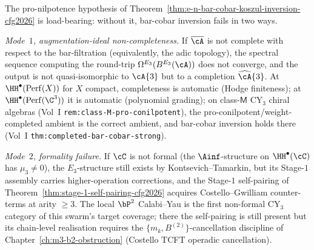 \begin{remark}
\label{rem:failure-modes-e3-bar-cobar-cfg2026}
The pro-nilpotence hypothesis of
Theorem~\textup{\ref{thm:e-n-bar-cobar-koszul-inversion-cfg2026}}
is load-bearing: without it, bar-cobar inversion fails in two ways.

\emph{Mode~$1$, augmentation-ideal non-completeness.} If
$\overline{\cA}$ is not complete with respect to the bar-filtration
(equivalently, the adic topology), the spectral sequence computing the
round-trip $\Omega^{E_3}(B^{E_3}(\cA))$ does not converge, and the
output is not quasi-isomorphic to $\cA\{3\}$ but to a completion
$\widehat{\cA}\{3\}$. At $\HH^\bullet(\mathrm{Perf}(X))$ for $X$
compact, completeness is automatic (Hodge finiteness); at
$\HH^\bullet(\mathrm{Perf}(\C^3))$ it is automatic (polynomial
grading); on class-$\mathsf{M}$ CY$_3$ chiral algebras (Vol~I
\texttt{rem:class-M-pro-conilpotent}), the pro-conilpotent/weight-completed
ambient is the correct ambient, and bar-cobar inversion holds there
(Vol~I \texttt{thm:completed-bar-cobar-strong}).

\emph{Mode~$2$, formality failure.} If $\cC$ is not formal (the
$\Ainf$-structure on $\HH^\bullet(\cC)$ has $\mu_3 \neq 0$), the
$E_3$-structure still exists by Kontsevich--Tamarkin, but its
Stage-$1$ assembly carries higher-operation corrections, and the
Stage-$1$ self-pairing of
Theorem~\textup{\ref{thm:stage-1-self-pairing-cfg2026}} acquires
Costello--Gwilliam counter-terms at arity $\geq 3$. The local
$\bP^2$ Calabi--Yau is the first non-formal CY$_3$ category of this
swarm's target coverage; there the self-pairing is still present but
its chain-level realisation requires the $\{m_k, B^{(2)}\}$-cancellation
discipline of Chapter~\textup{\ref{ch:m3-b2-obstruction}} (Costello
TCFT operadic cancellation).
\end{remark}

